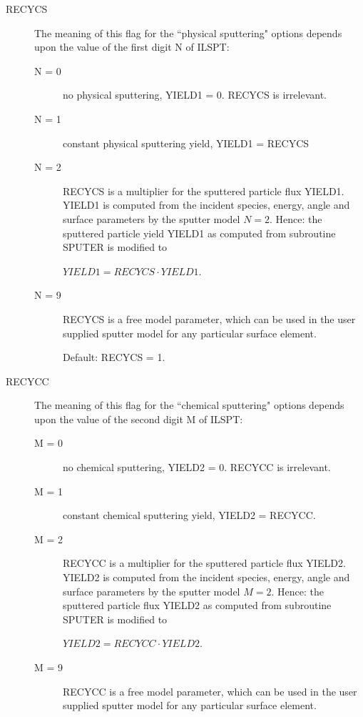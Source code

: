 \begin{description}
  \item[RECYCS] The meaning of this flag for the ``physical sputtering" options
        depends upon the value of the first digit N of ILSPT:
        \begin{description}
          \item[N = 0] no physical sputtering, YIELD1 = 0.
                RECYCS is irrelevant.
          \item[N = 1] constant physical sputtering yield, YIELD1 = RECYCS
          \item[N = 2]
                RECYCS is a multiplier for the sputtered particle flux YIELD1.
                YIELD1 is computed from the incident species, energy, angle and surface
                parameters by the sputter model $N=2$.
                Hence:
                the sputtered particle yield YIELD1
                as computed from subroutine SPUTER
                is modified to

                $YIELD1 = RECYCS \cdot YIELD1 $.
          \item[N = 9] RECYCS is a free model parameter, which can be used in the user
                supplied sputter model for any particular surface element.

                Default: RECYCS = 1.
        \end{description}
  \item[RECYCC] The meaning of this flag for the ``chemical sputtering" options
        depends upon the value of the second digit M of ILSPT:
        \begin{description}
          \item[M = 0] no chemical sputtering, YIELD2 = 0.
                RECYCC is irrelevant.
          \item[M = 1] constant chemical sputtering yield, YIELD2 = RECYCC.
          \item[M = 2] RECYCC is a multiplier for the sputtered particle flux YIELD2.
                YIELD2 is computed from the incident species, energy, angle and surface
                parameters by the sputter model $M=2$.
                Hence:
                the sputtered particle flux YIELD2
                as computed from subroutine SPUTER
                is modified to

                $YIELD2 = RECYCC \cdot YIELD2 $.
          \item[M = 9] RECYCC is a free model parameter, which can be used in the user
                supplied sputter model for any particular surface element.


\end{description}
\end{description}
